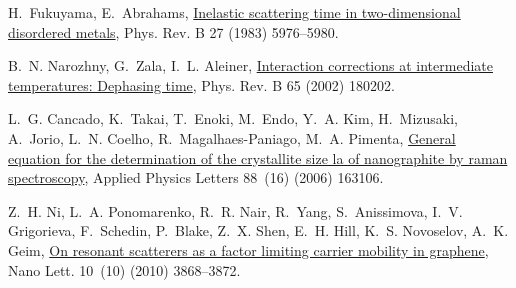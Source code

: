 \documentclass[final,5p,times,twocolumn]{elsarticle}
\begin{document}
\begin{thebibliography}{10}
H.~Fukuyama, E.~Abrahams,
  \href{https://link.aps.org/doi/10.1103/PhysRevB.27.5976}{Inelastic scattering
  time in two-dimensional disordered metals}, Phys. Rev. B 27 (1983)
  5976--5980.

B.~N. Narozhny, G.~Zala, I.~L. Aleiner,
  \href{https://link.aps.org/doi/10.1103/PhysRevB.65.180202}{Interaction
  corrections at intermediate temperatures: Dephasing time}, Phys. Rev. B 65
  (2002) 180202.

L.~G. Cancado, K.~Takai, T.~Enoki, M.~Endo, Y.~A. Kim, H.~Mizusaki, A.~Jorio,
  L.~N. Coelho, R.~Magalhaes-Paniago, M.~A. Pimenta,
  \href{http://dx.doi.org/10.1063/1.2196057}{General equation for the
  determination of the crystallite size la of nanographite by raman
  spectroscopy}, Applied Physics Letters 88~(16) (2006) 163106.

Z.~H. Ni, L.~A. Ponomarenko, R.~R. Nair, R.~Yang, S.~Anissimova, I.~V.
  Grigorieva, F.~Schedin, P.~Blake, Z.~X. Shen, E.~H. Hill, K.~S. Novoselov,
  A.~K. Geim, \href{http://dx.doi.org/10.1021/nl101399r}{On resonant scatterers
  as a factor limiting carrier mobility in graphene}, Nano Lett. 10~(10) (2010)
  3868--3872.

\end{thebibliography}
\end{document}

